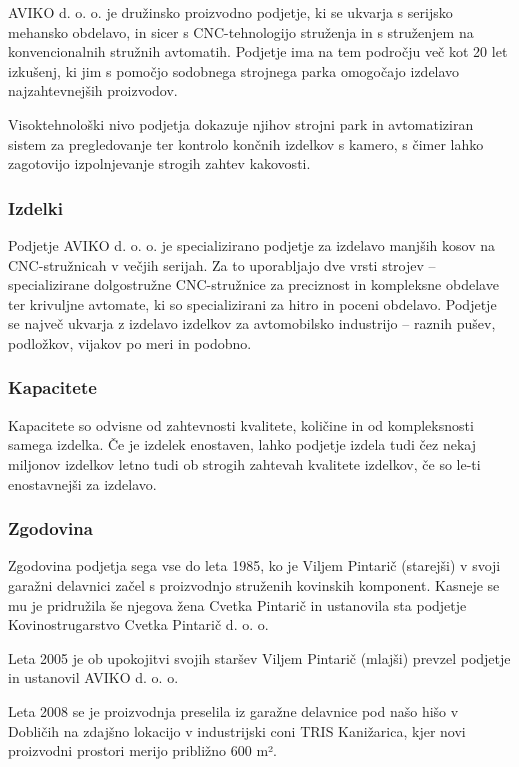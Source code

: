 AVIKO d. o. o. je družinsko proizvodno podjetje,
ki se ukvarja s serijsko mehansko obdelavo, in sicer
s CNC-tehnologijo struženja in s struženjem na
konvencionalnih stružnih avtomatih.
Podjetje ima na tem področju več kot 20 let izkušenj,
ki jim s pomočjo sodobnega strojnega parka omogočajo
izdelavo najzahtevnejših proizvodov.

Visoktehnološki nivo podjetja dokazuje njihov strojni
park in avtomatiziran sistem za pregledovanje ter
kontrolo končnih izdelkov s kamero, s čimer lahko
zagotovijo izpolnjevanje strogih zahtev kakovosti.

\subsubsection{Izdelki}
Podjetje AVIKO d. o. o. je specializirano podjetje za izdelavo manjših
kosov na CNC-stružnicah v večjih serijah. Za to uporabljajo dve
vrsti strojev -- specializirane dolgostružne CNC-stružnice za preciznost
in kompleksne obdelave ter krivuljne avtomate, ki so specializirani za
hitro in poceni obdelavo. Podjetje se največ ukvarja z izdelavo izdelkov
za avtomobilsko industrijo -- raznih pušev, podložkov, vijakov po meri in podobno.

\subsubsection{Kapacitete}
Kapacitete so odvisne od zahtevnosti kvalitete, količine
in od kompleksnosti samega izdelka. Če je izdelek enostaven,
lahko podjetje izdela tudi čez nekaj miljonov izdelkov letno
tudi ob strogih zahtevah kvalitete izdelkov, če so le-ti enostavnejši
za izdelavo.

\subsubsection{Zgodovina}
Zgodovina podjetja sega vse do leta 1985, ko je Viljem Pintarič (starejši) v svoji garažni delavnici začel s proizvodnjo struženih kovinskih komponent.
Kasneje se mu je pridružila še njegova žena Cvetka Pintarič in ustanovila sta
podjetje Kovinostrugarstvo Cvetka Pintarič d. o. o.

Leta 2005 je ob upokojitvi svojih staršev Viljem Pintarič (mlajši)
prevzel podjetje in ustanovil AVIKO d. o. o.

Leta 2008 se je proizvodnja preselila iz garažne delavnice pod našo hišo
v Dobličih na zdajšno lokacijo v industrijski coni TRIS Kanižarica,
kjer novi proizvodni prostori merijo približno 600 m².

